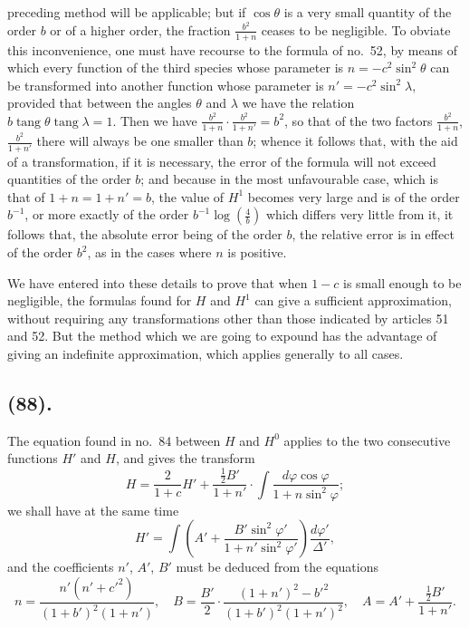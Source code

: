 \documentclass{article}
\begin{document}
preceding method will be applicable; but if $\cos\theta$ is a very small quantity of the order $b$ or of a higher order, the fraction $\frac{b^{2}}{1+n}$ ceases to be negligible. To obviate this inconvenience, one must have recourse to the formula of no.~52, by means of which every function of the third species whose parameter is $n=-c^{2}\sin^{2}\theta$ can be transformed into another function whose parameter is $n'=-c^{2}\sin^{2}\lambda$, provided that between the angles $\theta$ and $\lambda$ we have the relation $b\operatorname{tang}\theta\operatorname{tang}\lambda=1$. Then we have $\frac{b^{2}}{1+n}\cdot\frac{b^{2}}{1+n'}=b^{2}$, so that of the two factors $\frac{b^{2}}{1+n}$, $\frac{b^{2}}{1+n'}$ there will always be one smaller than $b$; whence it follows that, with the aid of a transformation, if it is necessary, the error of the formula will not exceed quantities of the order $b$; and because in the most unfavourable case, which is that of $1+n=1+n'=b$, the value of $H^{1}$ becomes very large and is of the order $b^{-1}$, or more exactly of the order $b^{-1}\log\left(\frac{4}{b}\right)$ which differs very little from it, it follows that, the absolute error being of the order $b$, the relative error is in effect of the order $b^{2}$, as in the cases where $n$ is positive.

We have entered into these details to prove that when $1-c$ is small enough to be negligible, the formulas found for $H$ and $H^{1}$ can give a sufficient approximation, without requiring any transformations other than those indicated by articles 51 and 52. But the method which we are going to expound has the advantage of giving an indefinite approximation, which applies generally to all cases.

\subsection*{(88).}

The equation found in no.~84 between $H$ and $H^{0}$ applies to the two consecutive functions $H'$ and $H$, and gives the transform
\[ H=\frac{2}{1+c}H'+\frac{\tfrac{1}{2}B'}{1+n'}\cdot\int\frac{d\varphi\cos\varphi}{1+n\sin^{2}\varphi}; \]
we shall have at the same time
\[ H'=\int\left(A'+\frac{B'\sin^{2}\varphi'}{1+n'\sin^{2}\varphi'}\right)\frac{d\varphi'}{\Delta'}, \]
and the coefficients $n'$, $A'$, $B'$ must be deduced from the equations
\[ n=\frac{n'(n'+c'^{2})}{(1+b')^{2}(1+n')},\quad B=\frac{B'}{2}\cdot\frac{(1+n')^{2}-b'^{2}}{(1+b')^{2}(1+n')^{2}},\quad A=A'+\frac{\tfrac{1}{2}B'}{1+n'}. \]
\end{document}
